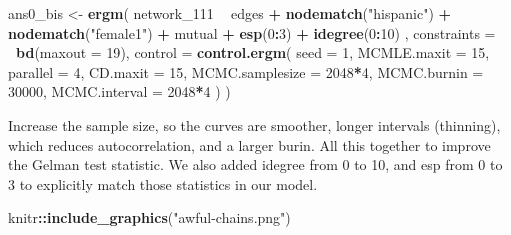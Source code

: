 \documentclass[]{book}
\newenvironment{Shaded}{\begin{snugshade}}{\end{snugshade}}
\newcommand{\DataTypeTok}[1]{\textcolor[rgb]{0.13,0.29,0.53}{#1}}
\newcommand{\DecValTok}[1]{\textcolor[rgb]{0.00,0.00,0.81}{#1}}
\newcommand{\KeywordTok}[1]{\textcolor[rgb]{0.13,0.29,0.53}{\textbf{#1}}}
\newcommand{\NormalTok}[1]{#1}
\newcommand{\OperatorTok}[1]{\textcolor[rgb]{0.81,0.36,0.00}{\textbf{#1}}}
\newcommand{\StringTok}[1]{\textcolor[rgb]{0.31,0.60,0.02}{#1}}
\begin{document}
\begin{Shaded}
\begin{Highlighting}[]
\NormalTok{ans0_bis <-}\StringTok{ }\KeywordTok{ergm}\NormalTok{(}
\NormalTok{  network_}\DecValTok{111} \OperatorTok{~}
\StringTok{    }\NormalTok{edges }\OperatorTok{+}
\StringTok{    }\KeywordTok{nodematch}\NormalTok{(}\StringTok{"hispanic"}\NormalTok{) }\OperatorTok{+}
\StringTok{    }\KeywordTok{nodematch}\NormalTok{(}\StringTok{"female1"}\NormalTok{) }\OperatorTok{+}
\StringTok{    }\NormalTok{mutual }\OperatorTok{+}\StringTok{ }
\StringTok{    }\KeywordTok{esp}\NormalTok{(}\DecValTok{0}\OperatorTok{:}\DecValTok{3}\NormalTok{) }\OperatorTok{+}\StringTok{ }
\StringTok{    }\KeywordTok{idegree}\NormalTok{(}\DecValTok{0}\OperatorTok{:}\DecValTok{10}\NormalTok{)}
\NormalTok{    ,}
  \DataTypeTok{constraints =} \OperatorTok{~}\KeywordTok{bd}\NormalTok{(}\DataTypeTok{maxout =} \DecValTok{19}\NormalTok{),}
  \DataTypeTok{control =} \KeywordTok{control.ergm}\NormalTok{(}
    \DataTypeTok{seed        =} \DecValTok{1}\NormalTok{,}
    \DataTypeTok{MCMLE.maxit =} \DecValTok{15}\NormalTok{,}
    \DataTypeTok{parallel    =} \DecValTok{4}\NormalTok{,}
    \DataTypeTok{CD.maxit    =} \DecValTok{15}\NormalTok{,}
    \DataTypeTok{MCMC.samplesize =} \DecValTok{2048}\OperatorTok{*}\DecValTok{4}\NormalTok{,}
    \DataTypeTok{MCMC.burnin =} \DecValTok{30000}\NormalTok{,}
    \DataTypeTok{MCMC.interval =} \DecValTok{2048}\OperatorTok{*}\DecValTok{4}
\NormalTok{    )}
\NormalTok{  )}
\end{Highlighting}
\end{Shaded}

Increase the sample size, so the curves are smoother, longer intervals (thinning), which reduces autocorrelation, and a larger burin. All this together to improve the Gelman test statistic. We also added idegree from 0 to 10, and esp from 0 to 3 to explicitly match those statistics in our model.

\begin{Shaded}
\begin{Highlighting}[]
\NormalTok{knitr}\OperatorTok{::}\KeywordTok{include_graphics}\NormalTok{(}\StringTok{"awful-chains.png"}\NormalTok{)}
\end{Highlighting}
\end{Shaded}
\end{document}
